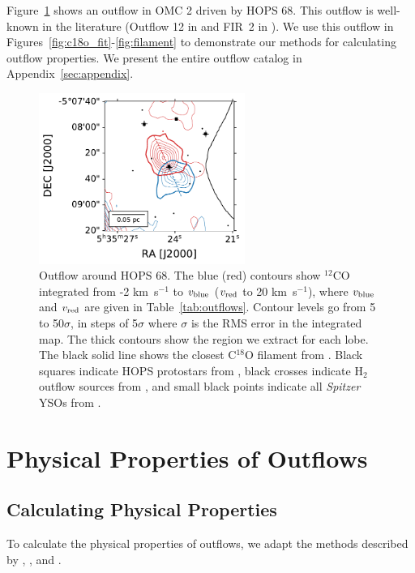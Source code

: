 \documentclass[twocolumn]{aastex63}
\newcommand{\example}{HOPS 68}
\newcommand{\kms}{km~s$^{-1}$}
\newcommand{\co}[1][]{\ensuremath{^{#1}}CO}
\begin{document}
Figure~\ref{fig:stamp} shows an outflow in OMC 2 driven by \example{}. This outflow is well-known in the literature (Outflow 12 in \citealp{Tanabe19} and FIR~2 in \citealp{Takahashi08}). We use this outflow in Figures~\ref{fig:c18o_fit}-\ref{fig:filament} to demonstrate our methods for calculating outflow properties. We present the entire outflow catalog in Appendix~\ref{sec:appendix}.


\begin{figure}[htb!]
\centering
\includegraphics[width=0.6\textwidth]{stamp.pdf}
\caption{Outflow around \example{}. The blue (red) contours show \co[12]{} integrated from -2 \kms{} to $v_{\rm blue}$ ($v_{\rm red}$ to 20 \kms{}), where $v_{\rm blue}$ and $v_{\rm red}$ are given in Table~\ref{tab:outflows}. Contour levels go from 5 to 50$\sigma$, in steps of 5$\sigma$ where $\sigma$ is the RMS error in the integrated map. The thick contours show the region we extract for each lobe.%
The black solid line shows the closest C$^{18}$O filament from \citet{Suri19}. Black squares indicate HOPS protostars from \citet{Furlan16}, black crosses indicate H$_2$ outflow sources from \citet{Davis09}, and small black points indicate all \emph{Spitzer} YSOs from \citet{Megeath12}.\label{fig:stamp}}
\end{figure}

\section{Physical Properties of Outflows}\label{sec:physics}
\subsection{Calculating Physical Properties}
To calculate the physical properties of outflows, we adapt the methods described by \citet{Arce01}, \citet{Dunham14}, and \citet{ZhangY16}.
\end{document}
